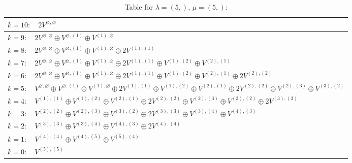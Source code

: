 \documentclass[a4paper,12pt]{article}
\begin{document}
\renewcommand{\arraystretch}{1.6} 
\begin{table}[H]
\centering
\caption{Table for $\lambda = (5,)$, $\mu = (5,)$:}
\begin{tabular}{|>{\centering\arraybackslash}p{15cm}|}
\hline
 $k = 10: \quad 2 V^{\varnothing, \varnothing} $ \\ \hline
 $k = 9: \quad 2 V^{\varnothing, \varnothing} \oplus V^{\varnothing, (1)} \oplus V^{(1), \varnothing} $ \\ \hline
 $k = 8: \quad 2 V^{\varnothing, \varnothing} \oplus V^{\varnothing, (1)} \oplus V^{(1), \varnothing} \oplus 2 V^{(1), (1)} $ \\ \hline
 $k = 7: \quad 2 V^{\varnothing, \varnothing} \oplus V^{\varnothing, (1)} \oplus V^{(1), \varnothing} \oplus 2 V^{(1), (1)} \oplus V^{(1), (2)} \oplus V^{(2), (1)} $ \\ \hline
 $k = 6: \quad 2 V^{\varnothing, \varnothing} \oplus V^{\varnothing, (1)} \oplus V^{(1), \varnothing} \oplus 2 V^{(1), (1)} \oplus V^{(1), (2)} \oplus V^{(2), (1)} \oplus 2 V^{(2), (2)} $ \\ \hline
 $k = 5: \quad V^{\varnothing, \varnothing} \oplus V^{\varnothing, (1)} \oplus V^{(1), \varnothing} \oplus 2 V^{(1), (1)} \oplus V^{(1), (2)} \oplus V^{(2), (1)} \oplus 2 V^{(2), (2)} \oplus V^{(2), (3)} \oplus V^{(3), (2)} $ \\ \hline
 $k = 4: \quad V^{(1), (1)} \oplus V^{(1), (2)} \oplus V^{(2), (1)} \oplus 2 V^{(2), (2)} \oplus V^{(2), (3)} \oplus V^{(3), (2)} \oplus 2 V^{(3), (3)} $ \\ \hline
 $k = 3: \quad V^{(2), (2)} \oplus V^{(2), (3)} \oplus V^{(3), (2)} \oplus 2 V^{(3), (3)} \oplus V^{(3), (4)} \oplus V^{(4), (3)} $ \\ \hline
 $k = 2: \quad V^{(3), (3)} \oplus V^{(3), (4)} \oplus V^{(4), (3)} \oplus 2 V^{(4), (4)} $ \\ \hline
 $k = 1: \quad V^{(4), (4)} \oplus V^{(4), (5)} \oplus V^{(5), (4)} $ \\ \hline
 $k = 0: \quad V^{(5), (5)} $ \\ \hline
\end{tabular}
\end{table}
\end{document}

